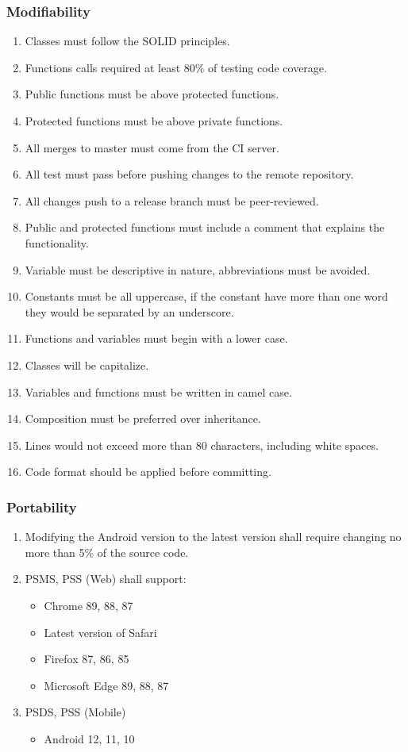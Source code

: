 \subsubsection{Modifiability}
\begin{enumerate}[label=MOD-\arabic*]
    \item Classes must follow the SOLID principles. \cite{solid}
    \item Functions calls required at least 80\% of testing code coverage.
    \item Public functions must be above protected functions.
    \item Protected functions must be above private functions.
    \item All merges to master must come from the CI server.
    \item All test must pass before pushing changes to the remote repository.
    \item All changes push to a release branch must be peer-reviewed.
    \item Public and protected functions must include a comment that explains 
    the functionality.
    \item Variable must be descriptive in nature, abbreviations must be 
    avoided.
    \item Constants must be all uppercase, if the constant have more than one 
    word they would be separated by an underscore.
    \item Functions and variables must begin with a lower case.
    \item Classes will be capitalize.
    \item Variables and functions must be written in camel case.
    \item Composition must be preferred over inheritance.
    \item Lines would not exceed more than 80 characters, including white 
    spaces.
    \item Code format should be applied before committing.
\end{enumerate}
\pagebreak
\subsubsection{Portability}
\begin{enumerate}[label=POR-\arabic*]
    \item Modifying the Android version to the latest version shall require 
    changing no more than 5\% of the source code.
    \item PSMS, PSS (Web) shall support:
    \begin{itemize}
        \item Chrome 89, 88, 87
        \item Latest version of Safari
        \item Firefox 87, 86, 85
        \item Microsoft Edge 89, 88, 87
    \end{itemize}
    \item PSDS, PSS (Mobile)
    \begin{itemize}
        \item Android 12, 11, 10
    \end{itemize}
\end{enumerate}
